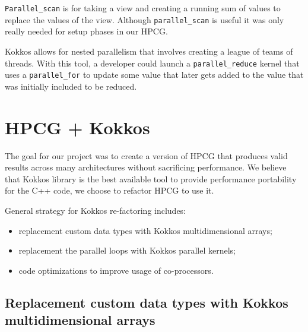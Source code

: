 \documentclass{ccr15}
\begin{document}
\texttt{Parallel\_scan} is for taking a view and creating a running sum of values
to replace the values of the view. Although \texttt{parallel\_scan} is useful it was only really needed
for setup phases in our HPCG.

Kokkos allows for nested parallelism that involves creating a league of teams of threads.
With this tool, a developer could launch a \texttt{parallel\_reduce} kernel that uses a \texttt{parallel\_for} to
update some value that later gets added to the value that was initially included to be reduced.



\section{HPCG + Kokkos}

The goal for our project was to create a version of HPCG that 
produces valid results across many architectures without sacrificing performance.
We believe that Kokkos library is the best available tool to provide performance portability for the C++ code, we choose to refactor HPCG to use it.

General strategy for Kokkos re-factoring includes: 
\begin{itemize}
\item replacement custom data types with Kokkos multidimensional arrays; 
\item replacement the parallel loops with Kokkos parallel kernels; 
\item code optimizations to improve usage of co-processors.
\end{itemize}




\subsection{Replacement custom data types with Kokkos multidimensional arrays}
\end{document}
